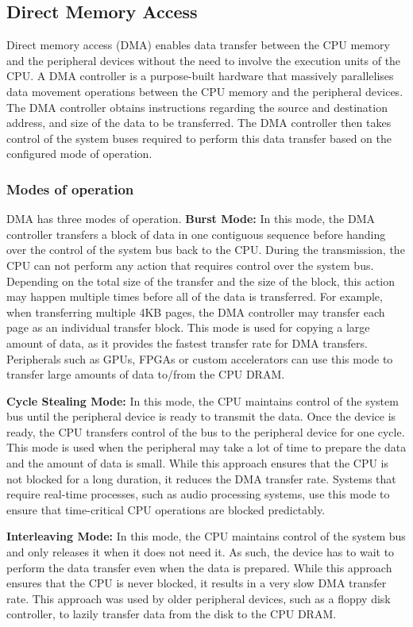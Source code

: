 \subsection{Direct Memory Access}
\label{subsec:interconnect-sc-background-dma}

Direct memory access (DMA) enables data transfer between the CPU memory and the peripheral devices without the need to involve the execution units of the CPU.
A DMA controller is a purpose-built hardware that massively parallelises data movement operations between the CPU memory and the peripheral devices.
The DMA controller obtains instructions regarding the source and destination address, and size of the data to be transferred.
The DMA controller then takes control of the system buses required to perform this data transfer based on the configured mode of operation.

\subsubsection{Modes of operation}
DMA has three modes of operation.
\textbf{Burst Mode:} In this mode, the DMA controller transfers a block of data in one contiguous sequence before handing over the control of the system bus back to the CPU.
During the transmission, the CPU can not perform any action that requires control over the system bus.
Depending on the total size of the transfer and the size of the block, this action may happen multiple times before all of the data is transferred.
For example, when transferring multiple 4KB pages, the DMA controller may transfer each page as an individual transfer block.
This mode is used for copying a large amount of data, as it provides the fastest transfer rate for DMA transfers.
Peripherals such as GPUs, FPGAs or custom accelerators can use this mode to transfer large amounts of data to/from the CPU DRAM.

\textbf{Cycle Stealing Mode:} In this mode, the CPU maintains control of the system bus until the peripheral device is ready to transmit the data.
Once the device is ready, the CPU transfers control of the bus to the peripheral device for one cycle.
This mode is used when the peripheral may take a lot of time to prepare the data and the amount of data is small.
While this approach ensures that the CPU is not blocked for a long duration, it reduces the DMA transfer rate.
Systems that require real-time processes, such as audio processing systems, use this mode to ensure that time-critical CPU operations are blocked predictably.

\textbf{Interleaving Mode:} In this mode, the CPU maintains control of the system bus and only releases it when it does not need it.
As such, the device has to wait to perform the data transfer even when the data is prepared.
While this approach ensures that the CPU is never blocked, it results in a very slow DMA transfer rate.
This approach was used by older peripheral devices, such as a floppy disk controller, to lazily transfer data from the disk to the CPU DRAM.